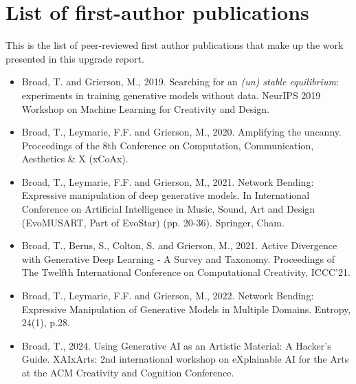 \chapter*{List of first-author publications}

This is the list of peer-reviewed first author publications that make up the work presented in this upgrade report. 
\begin{itemize}
\item Broad, T. and Grierson, M., 2019. Searching for an \textit{(un) stable equilibrium}: experiments in training generative models without data. NeurIPS 2019 Workshop on Machine Learning for Creativity and Design. 
\item Broad, T., Leymarie, F.F. and Grierson, M., 2020. Amplifying the uncanny. Proceedings of the 8th Conference on Computation, Communication, Aesthetics \& X (xCoAx).
\item Broad, T., Leymarie, F.F. and Grierson, M., 2021. Network Bending: Expressive manipulation of deep generative models. In International Conference on Artificial Intelligence in Music, Sound, Art and Design (EvoMUSART, Part of EvoStar) (pp. 20-36). Springer, Cham.
\item Broad, T., Berns, S., Colton, S. and Grierson, M., 2021. Active Divergence with Generative Deep Learning - A Survey and Taxonomy. Proceedings of The Twelfth International Conference on Computational Creativity, ICCC’21. 
\item Broad, T., Leymarie, F.F. and Grierson, M., 2022. Network Bending: Expressive Manipulation of Generative Models in Multiple Domains. Entropy, 24(1), p.28.
\item Broad, T., 2024. Using Generative AI as an Artistic Material: A Hacker's Guide. XAIxArts: 2nd international workshop on eXplainable AI for the Arts at the ACM Creativity and Cognition Conference.
\end{itemize}